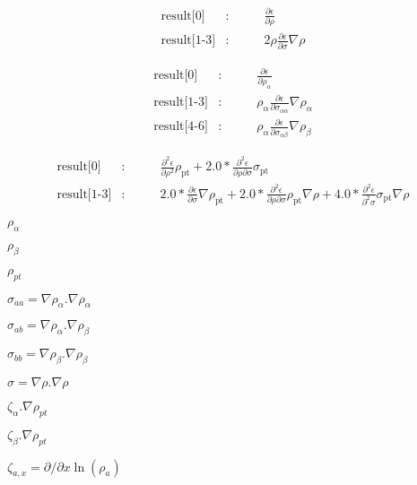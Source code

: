 \documentclass{article}
\begin{document}
\begin{eqnarray*}
    \mbox{result[0]}    &:& \qquad \frac{\partial \epsilon}{\partial \rho} \\
    \mbox{result[1-3]}  &:& \qquad 2 \rho \frac{\partial \epsilon}{\partial \sigma} \nabla\rho
\end{eqnarray*}
\pagebreak

\begin{eqnarray*}
    \mbox{result[0]}    &:& \qquad \frac{\partial \epsilon}{\partial \rho_{\alpha}} \\
    \mbox{result[1-3]}  &:& \qquad \rho_\alpha \frac{\partial \epsilon}{\partial \sigma_{\alpha \alpha}} \nabla\rho_\alpha\\
    \mbox{result[4-6]}  &:& \qquad \rho_\alpha \frac{\partial \epsilon}{\partial \sigma_{\alpha \beta}} \nabla\rho_\beta
\end{eqnarray*}
\pagebreak

\begin{eqnarray*}
    \mbox{result[0]}    &:& \qquad \frac{\partial^2 \epsilon}{\partial \rho^2} \rho_\mathrm{pt}
                            + 2.0 * \frac{\partial^2 \epsilon}{\partial \rho\partial\sigma}\sigma_\mathrm{pt}\\
    \mbox{result[1-3]}  &:& \qquad 2.0 * \frac{\partial\epsilon}{\partial\sigma}\nabla\rho_\mathrm{pt}
                            + 2.0 * \frac{\partial^2\epsilon}{\partial\rho\partial\sigma} \rho_\mathrm{pt}\nabla\rho
                            + 4.0 * \frac{\partial^2\epsilon}{\partial^2\sigma} \sigma_\mathrm{pt}\nabla\rho
\end{eqnarray*}
\pagebreak

$ \rho_\alpha $
\pagebreak

$ \rho_\beta $
\pagebreak

$ \rho_{pt} $
\pagebreak

$ \sigma_{aa} = \nabla \rho_{\alpha}.\nabla \rho_{\alpha} $
\pagebreak

$ \sigma_{ab} = \nabla \rho_{\alpha}.\nabla \rho_{\beta} $
\pagebreak

$ \sigma_{bb} = \nabla \rho_{\beta}.\nabla \rho_{\beta} $
\pagebreak

$ \sigma = \nabla \rho.\nabla \rho $
\pagebreak

$ \zeta_{\alpha}.\nabla\rho_{pt} $
\pagebreak

$ \zeta_{\beta}.\nabla\rho_{pt} $
\pagebreak

$ \zeta_{a,x}=\partial/{\partial x} \ln(\rho_a)  $
\pagebreak
\end{document}
